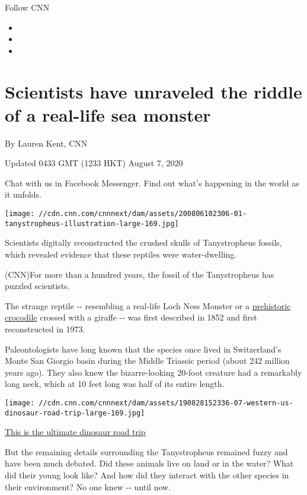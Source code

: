 Follow CNN

\begin{itemize}
\item
\item
\item
\end{itemize}

\hypertarget{scientists-have-unraveled-the-riddle-of-a-real-life-sea-monster}{%
\section{Scientists have unraveled the riddle of a real-life sea
monster}\label{scientists-have-unraveled-the-riddle-of-a-real-life-sea-monster}}

By Lauren Kent, CNN

Updated 0433 GMT (1233 HKT) August 7, 2020

Chat with us in Facebook Messenger. Find out what's happening in the
world as it unfolds.

\texttt{[image: //cdn.cnn.com/cnnnext/dam/assets/200806102306-01-tanystropheus-illustration-large-169.jpg]}

Scientists digitally reconstructed the crushed skulls of Tanystropheus
fossils, which revealed evidence that these reptiles were
water-dwelling.

(CNN)For more than a hundred years, the fossil of the Tanystropheus has
puzzled scientists.

The strange reptile -\/- resembling a real-life Loch Ness Monster or a
\href{https://www.cnn.com/2020/06/11/world/footprints-ancient-two-legged-crocodile-scn/index.html}{prehistoric
crocodile} crossed with a giraffe -\/- was first described in 1852 and
first reconstructed in 1973.

Paleontologists have long known that the species once lived in
Switzerland's Monte San Giorgio basin during the Middle Triassic period
(about 242 million years ago). They also knew the bizarre-looking
20-foot creature had a remarkably long neck, which at 10 feet long was
half of its entire length.

\href{/travel/article/dinosaurs-utah-colorado-scn/index.html}{}

\texttt{[image: //cdn.cnn.com/cnnnext/dam/assets/190828152336-07-western-us-dinosaur-road-trip-large-169.jpg]}

\href{/travel/article/dinosaurs-utah-colorado-scn/index.html}{This is
the ultimate dinosaur road trip}

But the remaining details surrounding the Tanystropheus remained fuzzy
and have been much debated. Did these animals live on land or in the
water? What did their young look like? And how did they interact with
the other species in their environment? No one knew -\/- until now.

